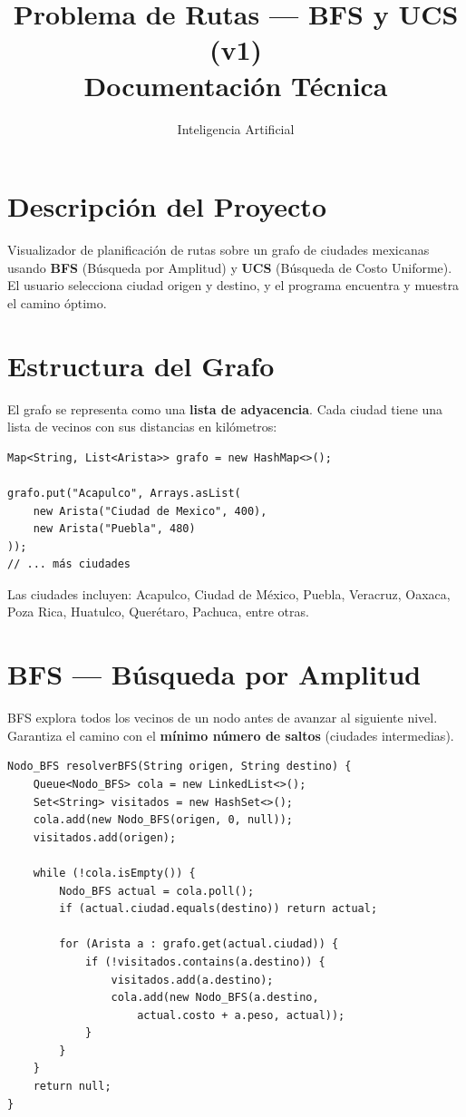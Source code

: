 \documentclass[12pt,a4paper]{article}
\title{\textbf{Problema de Rutas --- BFS y UCS (v1)}\\
  \large Documentación Técnica}
\author{Inteligencia Artificial}
\date{}
\begin{document}
\maketitle
\tableofcontents
\newpage

\section{Descripción del Proyecto}
Visualizador de planificación de rutas sobre un grafo de ciudades mexicanas usando \textbf{BFS} (Búsqueda por Amplitud) y \textbf{UCS} (Búsqueda de Costo Uniforme). El usuario selecciona ciudad origen y destino, y el programa encuentra y muestra el camino óptimo.

\section{Estructura del Grafo}

El grafo se representa como una \textbf{lista de adyacencia}. Cada ciudad tiene una lista de vecinos con sus distancias en kilómetros:

\begin{lstlisting}
Map<String, List<Arista>> grafo = new HashMap<>();

grafo.put("Acapulco", Arrays.asList(
    new Arista("Ciudad de Mexico", 400),
    new Arista("Puebla", 480)
));
// ... más ciudades
\end{lstlisting}

Las ciudades incluyen: Acapulco, Ciudad de México, Puebla, Veracruz, Oaxaca, Poza Rica, Huatulco, Querétaro, Pachuca, entre otras.

\section{BFS --- Búsqueda por Amplitud}

BFS explora todos los vecinos de un nodo antes de avanzar al siguiente nivel. Garantiza el camino con el \textbf{mínimo número de saltos} (ciudades intermedias).

\begin{lstlisting}
Nodo_BFS resolverBFS(String origen, String destino) {
    Queue<Nodo_BFS> cola = new LinkedList<>();
    Set<String> visitados = new HashSet<>();
    cola.add(new Nodo_BFS(origen, 0, null));
    visitados.add(origen);

    while (!cola.isEmpty()) {
        Nodo_BFS actual = cola.poll();
        if (actual.ciudad.equals(destino)) return actual;

        for (Arista a : grafo.get(actual.ciudad)) {
            if (!visitados.contains(a.destino)) {
                visitados.add(a.destino);
                cola.add(new Nodo_BFS(a.destino,
                    actual.costo + a.peso, actual));
            }
        }
    }
    return null;
}
\end{lstlisting}
\end{document}
